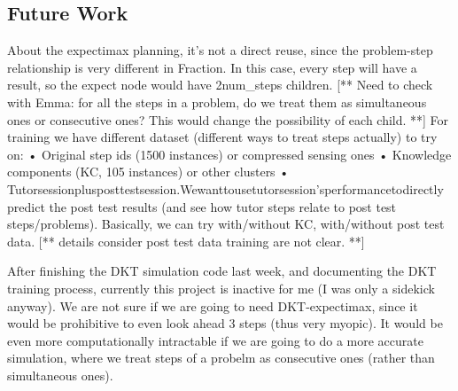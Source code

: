 \subsection{Future Work}
About the expectimax planning, it’s not a direct reuse, since the problem-step relationship is very different in Fraction. In this case, every step will have a result, so the expect node would have 2num_steps children. [** Need to check with Emma: for all the steps in a problem, do we treat them as simultaneous ones or consecutive ones? This would change the possibility of each child. **]
For training we have different dataset (different ways to treat steps actually) to try on:
• Original step ids (1500 instances) or compressed sensing ones
• Knowledge components (KC, 105 instances) or other clusters
• Tutorsessionplusposttestsession.Wewanttousetutorsession’sperformancetodirectly predict the post test results (and see how tutor steps relate to post test steps/problems).
Basically, we can try with/without KC, with/without post test data. [** details consider post test data training are not clear. **]


After finishing the DKT simulation code last week, and documenting the DKT training process, currently this project is inactive for me (I was only a sidekick anyway). We are not sure if we are going to need DKT-expectimax, since it would be prohibitive to even look ahead 3 steps (thus very myopic). It would be even more computationally intractable if we are going to do a more accurate simulation, where we treat steps of a probelm as consecutive ones (rather than simultaneous ones).
